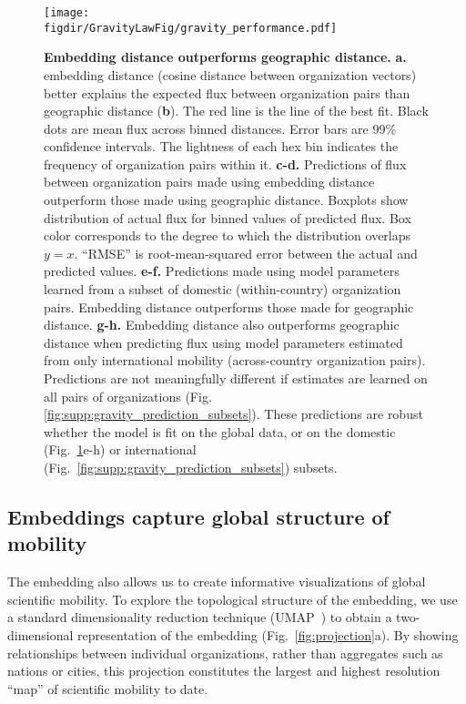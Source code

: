 \documentclass[12pt]{article} %
\def\figdir{../Figs}
\begin{document}
%
%
\begin{figure}[h!]
	\centering
	\texttt{[image: \\figdir/GravityLawFig/gravity\_performance.pdf]}
	\caption{
		\textbf{Embedding distance outperforms geographic distance.}
		\textbf{a.} embedding distance (cosine distance between organization vectors) better explains the expected flux between organization pairs than geographic distance (\textbf{b}).
		The red line is the line of the best fit.
		Black dots are mean flux across binned distances.
		Error bars are 99\% confidence intervals.
		The lightness of each hex bin indicates the frequency of organization pairs within it.
		\textbf{c-d.} Predictions of flux between organization pairs made using embedding distance outperform those made using geographic distance.
		Boxplots show distribution of actual flux for binned values of predicted flux.
		Box color corresponds to the degree to which the distribution overlaps $y = x$.
		``RMSE'' is root-mean-squared error between the actual and predicted values.
		\textbf{e-f.} Predictions made using model parameters learned from a subset of domestic (within-country) organization pairs.
		Embedding distance outperforms those made for geographic distance.
		\textbf{g-h.} Embedding distance also outperforms geographic distance when predicting flux using model parameters estimated from only international mobility (across-country organization pairs).
		Predictions are not meaningfully different if estimates are learned on all pairs of organizations (Fig. \ref{fig:supp:gravity_prediction_subsets}).
		These predictions are robust whether the model is fit on the global data, or on the domestic (Fig.~\ref{fig:gravity_performance}e-h) or international (Fig.~\ref{fig:supp:gravity_prediction_subsets}) subsets.
	}
	\label{fig:gravity_performance}
\end{figure}


\subsection*{Embeddings capture global structure of mobility}

The embedding also allows us to create informative visualizations of global scientific mobility.
To explore the topological structure of the embedding, we use a standard dimensionality reduction technique (UMAP~\autocite{mcinnes2018umap}) to obtain a two-dimensional representation of the embedding (Fig.~\ref{fig:projection}a).
By showing relationships between individual organizations, rather than aggregates such as nations or cities, this projection constitutes the largest and highest resolution ``map'' of scientific mobility to date.
\end{document}
